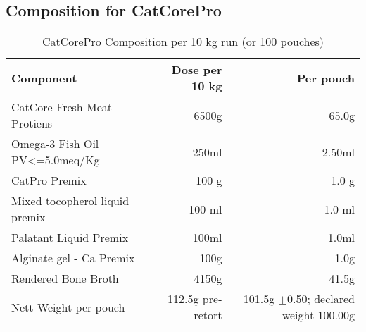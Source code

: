 \subsection*{Composition for CatCorePro}

\begin{table}[h]
\centering
\caption{CatCorePro Composition per 10 kg run (or 100 pouches)}
\label{tab:catcorepro_composition_}
\begin{tabular}{@{}l r r@{}}
\toprule
\textbf{Component} & \textbf{Dose per 10 kg} & \textbf{Per pouch} \\
\midrule
CatCore Fresh Meat Protiens & 6500g & 65.0g \\ [3pt]
Omega-3 Fish Oil PV<=5.0meq/Kg & 250ml & 2.50ml \\[3pt]
CatPro Premix & 100 g & 1.0 g \\[3pt]
Mixed tocopherol liquid premix & 100 ml & 1.0 ml \\[3pt]
Palatant Liquid Premix & 100ml & 1.0ml \\[3pt]
Alginate gel - Ca Premix & 100g & 1.0g \\[3pt]
\midrule
Rendered Bone Broth & 4150g & 41.5g \\[3pt]
\midrule
Nett Weight per pouch & 112.5g pre-retort & 101.5g $\pm$0.50; declared weight 100.00g\\[3pt]
\bottomrule
\end{tabular}
\end{table}


